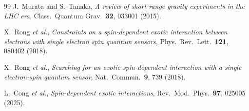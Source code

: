 \documentclass[12pt,a4paper]{report}
\begin{document}
\begin{thebibliography}{99}
J.~Murata and S.~Tanaka,
\textit{A review of short-range gravity experiments in the LHC era},
Class.\ Quantum Grav.\ \textbf{32}, 033001 (2015).

X.~Rong \textit{et al.},
\textit{Constraints on a spin-dependent exotic interaction between electrons
with single electron spin quantum sensors},
Phys.\ Rev.\ Lett.\ \textbf{121}, 080402 (2018).

X.~Rong \textit{et al.},
\textit{Searching for an exotic spin-dependent interaction with a single
electron-spin quantum sensor},
Nat.\ Commun.\ \textbf{9}, 739 (2018).

L.~Cong \textit{et al.},
\textit{Spin-dependent exotic interactions},
Rev.\ Mod.\ Phys.\ \textbf{97}, 025005 (2025).

\end{thebibliography}
\end{document}
